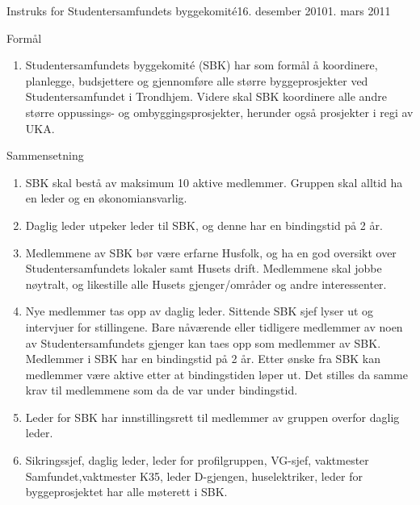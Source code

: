 \documentclass[../fsbok.tex]{subfiles}
\begin{document}
\begin{instruks}{Instruks for Studentersamfundets byggekomité}{16. desember 2010}{1. mars 2011}

    \begin{instruksledd}{Formål}
        \begin{enumerate}
            \item Studentersamfundets byggekomit\'e (SBK) har som formål å koordinere, planlegge,
                budsjettere og
                gjennomføre alle større byggeprosjekter ved Studentersamfundet i Trondhjem. Videre
                skal SBK koordinere
                alle andre større oppussings- og ombyggingsprosjekter, herunder også prosjekter i
                regi av UKA.
        \end{enumerate}
    \end{instruksledd}

    \begin{instruksledd}{Sammensetning}
        \begin{enumerate}
            \item SBK skal bestå av maksimum 10 aktive medlemmer. Gruppen skal alltid ha en leder og en
                økonomiansvarlig.
            \item Daglig leder utpeker leder til SBK, og denne har en bindingstid på 2 år.
            \item Medlemmene av SBK bør være erfarne Husfolk, og ha en god oversikt over
                Studentersamfundets lokaler
                samt Husets drift. Medlemmene skal jobbe nøytralt, og likestille alle Husets
                gjenger/områder og andre interessenter.
            \item Nye medlemmer tas opp av daglig leder. Sittende SBK sjef lyser ut og intervjuer
                for stillingene. Bare
                nåværende eller tidligere medlemmer av noen av Studentersamfundets gjenger kan
                taes opp som medlemmer av SBK. Medlemmer i SBK har en bindingstid på 2 år.
		Etter ønske fra SBK kan medlemmer være aktive etter at
		bindingstiden løper ut. Det stilles da samme krav til medlemmene
		som da de var under bindingstid.
            \item Leder for SBK har innstillingsrett til medlemmer av gruppen overfor daglig
                leder.
            \item Sikringssjef, daglig leder, leder for profilgruppen, VG-sjef, vaktmester 
	    	Samfundet,vaktmester K35, leder D-gjengen, huselektriker, leder
		for byggeprosjektet har alle møterett i SBK.
        \end{enumerate}
    \end{instruksledd}


\end{instruks}
\end{document}
